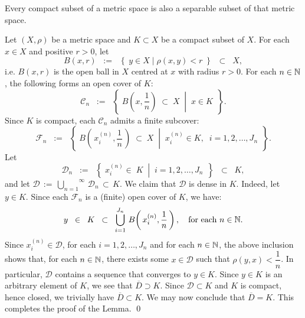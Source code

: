 \begin{lemma}\label{lemma:CompactImpliesSeparable}
\mbox{}
\vskip 0.3cm
\noindent
Every compact subset of a metric space is also a separable subset of that metric space.
\end{lemma}
\proof
Let $(X,\rho)$ be a metric space and $K \subset X$ be a compact subset of $X$.
For each $x \in X$ and positive $r > 0$, let
\begin{equation*}
B(x,r)
\;\; := \;\; \left\{\;y \in X \;\vert\; \rho(x,y) < r \;\right\}
\;\;\subset\;\; X,
\end{equation*}
i.e. $B(x,r)$ is the open ball in $X$ centred at $x$ with radius $r > 0$.
For each $n \in \mathbb{N}$, the following forms an open cover of $K$:
\begin{equation*}
\mathcal{C}_{n}
\;\; := \;\;
\left\{\;
\left.
B\!\left(x,\dfrac{1}{n}\right) \;\subset\; X
\;\;\right\vert\;\;
x \in K
\,\;\right\}.
\end{equation*}
Since $K$ is compact, each $\mathcal{C}_{n}$ admits a finite subcover:
\begin{equation*}
\mathcal{F}_{n}
\;\; := \;\;
\left\{\;
\left.
B\!\left(\,x^{(n)}_{i},\dfrac{1}{n}\,\right) \;\subset\; X
\;\;\right\vert\;\;
x^{(n)}_{i} \in K,\;\;
i = 1, 2, \ldots, J_{n}
\,\;\right\}.
\end{equation*}
Let
\begin{equation*}
\mathcal{D}_{n}
\;\; := \;\;
\left\{\;
\left.
x^{(n)}_{i} \in\; K
\;\;\right\vert\;\;
i = 1, 2, \ldots, J_{n}
\,\;\right\}
\;\; \subset \;\; K,
\end{equation*}
and let $\mathcal{D} \,:=\, \overset{\infty}{\underset{n=1}{\bigcup}}\,\mathcal{D}_{n} \,\subset\, K$.
We claim that $\mathcal{D}$ is dense in $K$.
Indeed, let $y \in K$. Since each $\mathcal{F}_{n}$ is a (finite) open cover of $K$, we have:
\begin{equation*}
y \;\; \in \;\; K \;\; \subset \;\; \bigcup_{i=1}^{J_{n}}\,B\!\left(\,x^{(n)}_{i},\dfrac{1}{n}\,\right),
\quad
\textnormal{for each $n \in \mathbb{N}$}.
\end{equation*}
Since $x^{(n)}_{i} \in \mathcal{D}$, for each $i = 1, 2, \ldots, J_{n}$ and for each $n \in \mathbb{N}$,
the above inclusion shows that, for each $n \in \mathbb{N}$, there exists some $x \in \mathcal{D}$ such that $\rho(y,x) < \dfrac{1}{n}$.
In particular, $\mathcal{D}$ contains a sequence that converges to $y \in K$.
Since $y \in K$ is an arbitrary element of $K$, we see that $\overline{D} \supset K$.
Since $\mathcal{D} \subset K$ and $K$ is compact, hence closed, we trivially have $\overline{D} \subset K$.
We may now conclude that $\overline{D} = K$.
This completes the proof of the Lemma.
\qed

